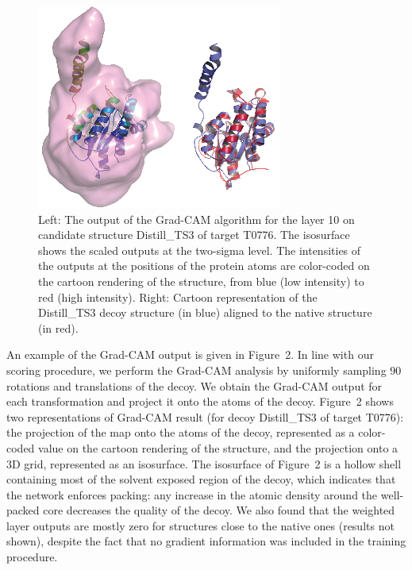 \documentclass{bioinfo}
\begin{document}
\begin{figure}[!tpb]
    \centering
    \includegraphics[width=\linewidth]{image6.eps}
    \caption{Left: The output of the Grad-CAM algorithm for the layer 10 on
    candidate structure Distill\_TS3 of target T0776. The isosurface
    shows the scaled outputs at the two-sigma level. The intensities
    of the outputs at the positions of the protein atoms are
    color-coded on the cartoon rendering of the structure, from blue
    (low intensity) to red (high intensity). Right: Cartoon
    representation of the Distill\_TS3 decoy structure (in blue)
    aligned to the native structure (in red).}
    \label{Fig:GradCAMT0776}
\end{figure}

An example of the Grad-CAM output is given in Figure~2\vphantom{\ref{Fig:GradCAMT0776}}.
In line with our scoring procedure, we perform the Grad-CAM analysis
by uniformly sampling 90 rotations and translations of the decoy. We
obtain the Grad-CAM output for each transformation and
project it onto the atoms of the decoy. 
Figure~2\vphantom{\ref{Fig:GradCAMT0776}} shows two representations of Grad-CAM result 
(for decoy Distill\_TS3 of target T0776): the
projection of the map onto the atoms of the decoy, represented as a
color-coded value on the cartoon rendering of the structure, and the
projection onto a 3D grid, represented as an isosurface. The
isosurface of Figure~2\vphantom{\ref{Fig:GradCAMT0776}} is a hollow shell containing
most of the solvent exposed region of the decoy, which indicates that
the network enforces packing: any increase in the atomic density
around the well-packed core decreases the quality of the decoy.
We also found that the weighted layer outputs are mostly zero for
structures close to the native ones (results not shown), despite the
fact that no gradient information was included in the training
procedure.
\end{document}
